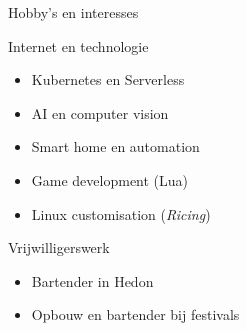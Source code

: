 \documentclass[12pt, a4paper]{article}
\begin{document}
\begin{cv}{}
\begin{cvlist}{Hobby's en interesses}
            \item Internet en technologie
            \begin{itemize}
                \item Kubernetes en Serverless
                \item AI en computer vision
                \item Smart home en automation
                \item Game development (Lua)
                \item Linux customisation (\textit{Ricing})
            \end{itemize}

            \item Vrijwilligerswerk
            \begin{itemize}
                \item Bartender in Hedon
                \item Opbouw en bartender bij festivals
            \end{itemize}

        \end{cvlist}
    \end{cv}
\end{document}
